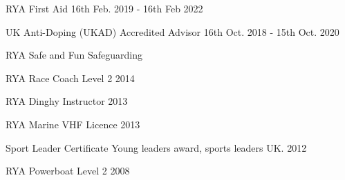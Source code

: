 

\begin{cvskills}

  \cvskill 
    {RYA First Aid} %
    {16th Feb. 2019 - 16th Feb 2022} %

 
  \cvskill
    {UK Anti-Doping (UKAD) Accredited Advisor} %
    {16th Oct. 2018 - 15th Oct. 2020} %
    

 \cvskill
    {RYA Safe and Fun Safeguarding} %
    {}

  \cvskill
    {RYA Race Coach Level 2} %
    {2014}

 
   \cvskill
    {RYA Dinghy Instructor} %
    {2013}


  \cvskill
    {RYA Marine VHF Licence} %
    {2013}


  \cvskill
    {Sport Leader Certificate} %
    {Young leaders award, sports leaders UK. 2012}

 
   \cvskill
    {RYA Powerboat Level 2} %
    {2008}


 \end{cvskills}

